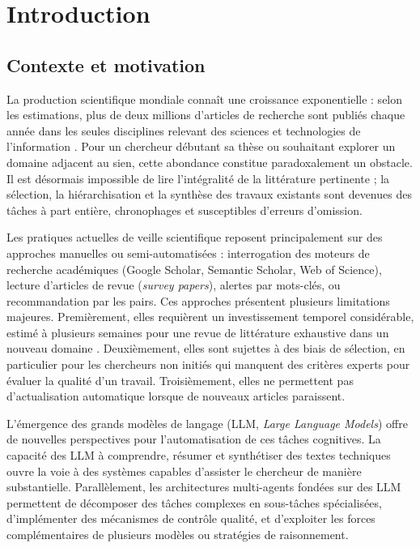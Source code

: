 \chapter{Introduction}
\label{ch:introduction}

\section{Contexte et motivation}

La production scientifique mondiale connaît une croissance exponentielle :
selon les estimations, plus de deux millions d'articles de recherche sont
publiés chaque année dans les seules disciplines relevant des sciences et
technologies de l'information \cite{priem2022openalex}. Pour un chercheur
débutant sa thèse ou souhaitant explorer un domaine adjacent au sien, cette
abondance constitue paradoxalement un obstacle. Il est désormais impossible
de lire l'intégralité de la littérature pertinente ; la sélection, la
hiérarchisation et la synthèse des travaux existants sont devenues des tâches
à part entière, chronophages et susceptibles d'erreurs d'omission.

Les pratiques actuelles de veille scientifique reposent principalement sur des
approches manuelles ou semi-automatisées : interrogation des moteurs de
recherche académiques (Google Scholar, Semantic Scholar, Web of Science),
lecture d'articles de revue (\textit{survey papers}), alertes par mots-clés,
ou recommandation par les pairs. Ces approches présentent plusieurs limitations
majeures. Premièrement, elles requièrent un investissement temporel considérable,
estimé à plusieurs semaines pour une revue de littérature exhaustive dans un
nouveau domaine \cite{kitchenham2007guidelines}. Deuxièmement, elles sont
sujettes à des biais de sélection, en particulier pour les chercheurs non
initiés qui manquent des critères experts pour évaluer la qualité d'un travail.
Troisièmement, elles ne permettent pas d'actualisation automatique lorsque de
nouveaux articles paraissent.

L'émergence des grands modèles de langage (LLM, \textit{Large Language Models})
\cite{openai2023gpt4, anthropic2024claude} offre de nouvelles perspectives pour
l'automatisation de ces tâches cognitives. La capacité des LLM à comprendre,
résumer et synthétiser des textes techniques ouvre la voie à des systèmes
capables d'assister le chercheur de manière substantielle. Parallèlement,
les architectures multi-agents fondées sur des LLM \cite{wang2024survey}
permettent de décomposer des tâches complexes en sous-tâches spécialisées,
d'implémenter des mécanismes de contrôle qualité, et d'exploiter les forces
complémentaires de plusieurs modèles ou stratégies de raisonnement.

